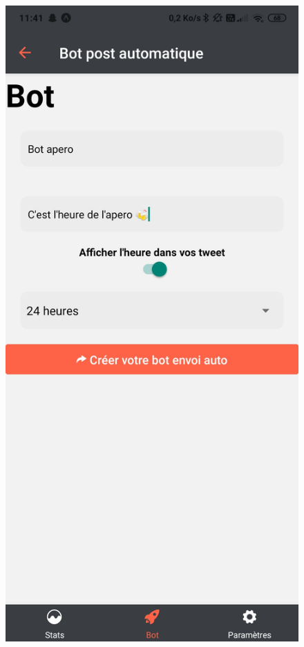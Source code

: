 \documentclass{article}
\begin{document}
\begin{figure}[h!]
\centering
\includegraphics[scale=0.1]{images/crea_bot_post.jpg}

\end{figure}
\end{document}
